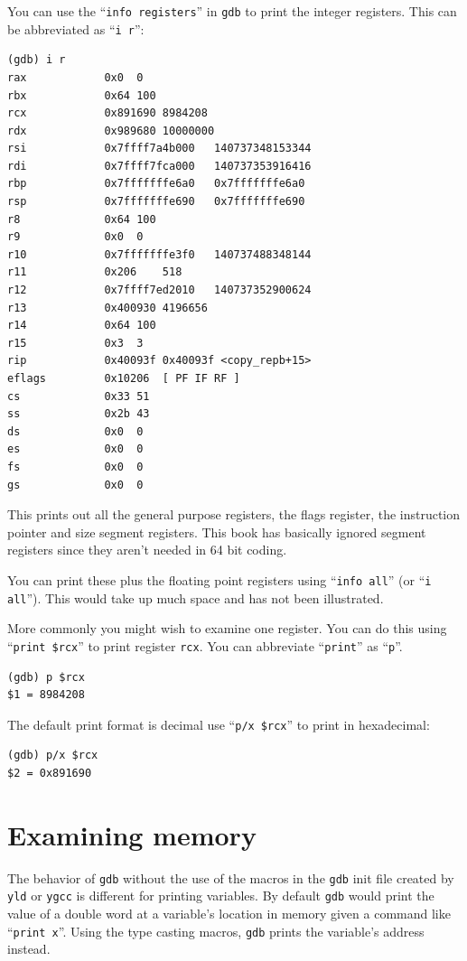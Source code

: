 \documentclass[11pt,b5paper]{book}
\begin{document}
You can use the ``{\tt info registers}'' in {\tt gdb} to print the integer registers.
This can be abbreviated as ``{\tt i r}'':
\begin{verbatim}
(gdb) i r
rax            0x0  0
rbx            0x64 100
rcx            0x891690 8984208
rdx            0x989680 10000000
rsi            0x7ffff7a4b000   140737348153344
rdi            0x7ffff7fca000   140737353916416
rbp            0x7fffffffe6a0   0x7fffffffe6a0
rsp            0x7fffffffe690   0x7fffffffe690
r8             0x64 100
r9             0x0  0
r10            0x7fffffffe3f0   140737488348144
r11            0x206    518
r12            0x7ffff7ed2010   140737352900624
r13            0x400930 4196656
r14            0x64 100
r15            0x3  3
rip            0x40093f 0x40093f <copy_repb+15>
eflags         0x10206  [ PF IF RF ]
cs             0x33 51
ss             0x2b 43
ds             0x0  0
es             0x0  0
fs             0x0  0
gs             0x0  0
\end{verbatim}

This prints out all the general purpose registers, the flags register, the instruction pointer
and size segment registers.
This book has basically ignored segment registers since they aren't needed in 64 bit coding.

You can print these plus the floating point registers using ``{\tt info all}'' (or ``{\tt i all}'').
This would take up much space and has not been illustrated.

More commonly you might wish to examine one register.
You can do this using ``{\tt print \$rcx}'' to print register {\tt rcx}.
You can abbreviate ``{\tt print}'' as ``{\tt p}''.
\begin{verbatim}
(gdb) p $rcx
$1 = 8984208
\end{verbatim}

The default print format is decimal use ``{\tt p/x \$rcx}'' to print in hexadecimal:
\begin{verbatim}
(gdb) p/x $rcx
$2 = 0x891690
\end{verbatim}

\section{Examining memory}

The behavior of {\tt gdb} without the use of the macros in the {\tt gdb} init file created by
{\tt yld} or {\tt ygcc} is different for printing variables.
By default {\tt gdb} would print the value of a double word at a variable's location in memory
given a command like ``{\tt print x}''.
Using the type casting macros, {\tt gdb} prints the variable's address instead.
\end{document}
